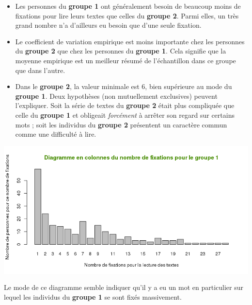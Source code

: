\documentclass[a4paper,11pt]{article}
\theoremstyle{nonumberplain}
\theoremstyle{nonumberplain}
\theoremstyle{nonumberplain}
\theoremstyle{nonumberplain}
\begin{document}
      \bigskip
      \begin{itemize}
          \item Les personnes du \textbf{groupe 1} ont généralement besoin de beaucoup moins
          de fixations pour lire leurs textes que celles du \textbf{groupe 2}. Parmi elles, un très grand nombre
          n'a d'ailleurs eu besoin que d'une seule fixation.

          \medskip
          \item Le coefficient de variation empirique est moins importante chez
          les personnes du \textbf{groupe 2} que chez les personnes du \textbf{groupe 1}.
          Cela signifie que la moyenne empirique est un meilleur résumé
          de l'échantillon dans ce groupe que dans l'autre.

          \medskip
          \item Dans le \textbf{groupe 2}, la valeur minimale est 6, bien
          supérieure au mode du \textbf{groupe 1}. Deux hypothèses (non mutuellement exclusives)
          peuvent l'expliquer. Soit la série de textes du \textbf{groupe 2} était plus
          compliquée que celle du \textbf{groupe 1} et obligeait \emph{forcément}
          à arrêter son regard sur certains mots ; soit les individus
          du \textbf{groupe 2} présentent un caractère commun comme une difficulté à lire.
      \end{itemize}

      \begin{center}
          \includegraphics[scale=0.75]{images/p2_q1_1.png}
      \end{center}

      Le mode de ce diagramme semble indiquer qu'il y a eu un mot en particulier
      sur lequel les individus du \textbf{groupe 1} se sont fixés massivement.
\end{document}
